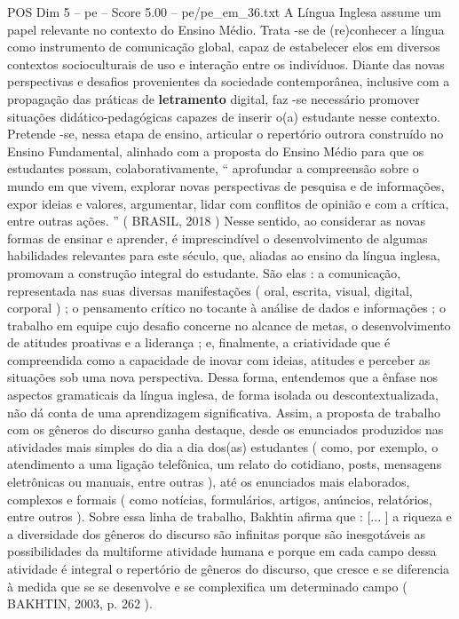 \begin{textsample}{POS Dim 5 – pe – Score 5.00 – pe/pe\_em\_36.txt}  \label{ex:f5_pos_208}
A Língua Inglesa assume um papel relevante no contexto do Ensino Médio.
Trata -se de (re)conhecer a língua como instrumento de comunicação global, capaz de estabelecer elos em diversos contextos socioculturais de uso e interação entre os indivíduos.
Diante das novas perspectivas e desafios provenientes da sociedade contemporânea, inclusive com a propagação das práticas de \textbf{letramento} digital, faz -se necessário promover situações didático-pedagógicas capazes de inserir o(a) estudante nesse contexto.
Pretende -se, nessa etapa de ensino, articular o repertório outrora construído no Ensino Fundamental, alinhado com a proposta do Ensino Médio para que os estudantes possam, colaborativamente, “ aprofundar a compreensão sobre o mundo em que vivem, explorar novas perspectivas de pesquisa e de informações, expor ideias e valores, argumentar, lidar com conflitos de opinião e com a crítica, entre outras ações. ” ( BRASIL, 2018 ) Nesse sentido, ao considerar as novas formas de ensinar e aprender, é imprescindível o desenvolvimento de algumas habilidades relevantes para este século, que, aliadas ao ensino da língua inglesa, promovam a construção integral do estudante.
São elas : a comunicação, representada nas suas diversas manifestações ( oral, escrita, visual, digital, corporal ) ; o pensamento crítico no tocante à análise de dados e informações ; o trabalho em equipe cujo desafio concerne no alcance de metas, o desenvolvimento de atitudes proativas e a liderança ; e, finalmente, a criatividade que é compreendida como a capacidade de inovar com ideias, atitudes e perceber as situações sob uma nova perspectiva.
Dessa forma, entendemos que a ênfase nos aspectos gramaticais da língua inglesa, de forma isolada ou descontextualizada, não dá conta de uma aprendizagem significativa.
Assim, a proposta de trabalho com os gêneros do discurso ganha destaque, desde os enunciados produzidos nas atividades mais simples do dia a dia dos(as) estudantes ( como, por exemplo, o atendimento a uma ligação telefônica, um relato do cotidiano, posts, mensagens eletrônicas ou manuais, entre outras ), até os enunciados mais elaborados, complexos e formais ( como notícias, formulários, artigos, anúncios, relatórios, entre outros ).
Sobre essa linha de trabalho, Bakhtin afirma que : [... ] a riqueza e a diversidade dos gêneros do discurso são infinitas porque são inesgotáveis as possibilidades da multiforme atividade humana e porque em cada campo dessa atividade é integral o repertório de gêneros do discurso, que cresce e se diferencia à medida que se se desenvolve e se complexifica um determinado campo ( BAKHTIN, 2003, p. 262 ).

\end{textsample}
